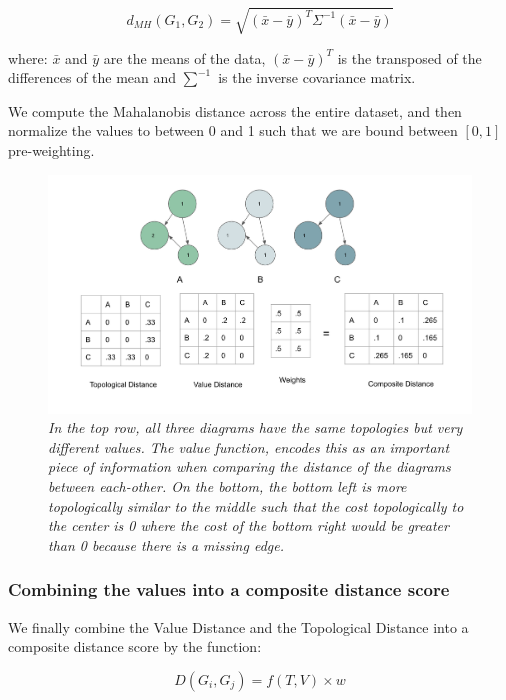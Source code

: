 \begin{equation}
d_{MH}(G_{1}, G_{2}) = \sqrt{(\bar{x}-\bar{y})^{T}\Sigma^{-1}(\bar{x}-\bar{y})}
\end{equation}

where: $\bar{x}$ and $\bar{y}$  are the means of the data, $(\bar{x}-\bar{y})^{T}$ is the transposed of the differences of the mean and $\sum^{-1}$ is the inverse covariance matrix.

We compute the Mahalanobis distance across the entire dataset, and then normalize the values to between 0 and 1 such that we are bound between $[0,1]$ pre-weighting.

\begin{figure}[t]
	\centering
        \includegraphics[width=1\textwidth]{images/value_cost.png}
	\caption{\textit{In the top row, all three diagrams have the same topologies but very different values. The value function, encodes this as an important piece of information when comparing the distance of the diagrams between each-other. On the bottom, the bottom left is more topologically similar to the middle such that the cost topologically to the center is 0 where the cost of the bottom right would be greater than 0 because there is a missing edge. }}
	\label{fig:sample store sales dataset}
\end{figure}

\subsubsection{Combining the values into a composite distance score}
\label{subsec:distance_score_composite}

We finally combine the Value Distance and the Topological Distance into a composite distance score by the function:

\begin{equation}
D(G_{i},G_{j}) = f(T,V)\times{w}
\end{equation}

